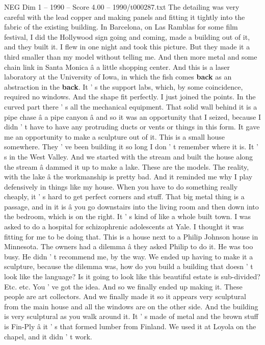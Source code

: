 \begin{textsample}{NEG Dim 1 – 1990 – Score 4.00 – 1990/t000287.txt}
The detailing was very careful with the lead copper and making panels and fitting it tightly into the fabric of the existing building.
In Barcelona, on Las Ramblas for some film festival, I did the Hollywood sign going and coming, made a building out of it, and they built it.
I flew in one night and took this picture.
But they made it a third smaller than my model without telling me.
And then more metal and some chain link in Santa Monica â a little shopping center.
And this is a laser laboratory at the University of Iowa, in which the fish comes \textbf{back} as an abstraction in the \textbf{back}.
It ' s the support labs, which, by some coincidence, required no windows.
And the shape fit perfectly.
I just joined the points.
In the curved part there ' s all the mechanical equipment.
That solid wall behind it is a pipe chase â a pipe canyon â and so it was an opportunity that I seized, because I didn ' t have to have any protruding ducts or vents or things in this form.
It gave me an opportunity to make a sculpture out of it.
This is a small house somewhere.
They ' ve been building it so long I don ' t remember where it is.
It ' s in the West Valley.
And we started with the stream and built the house along the stream â dammed it up to make a lake.
These are the models.
The reality, with the lake â the workmanship is pretty bad.
And it reminded me why I play defensively in things like my house.
When you have to do something really cheaply, it ' s hard to get perfect corners and stuff.
That big metal thing is a passage, and in it is â you go downstairs into the living room and then down into the bedroom, which is on the right.
It ' s kind of like a whole built town.
I was asked to do a hospital for schizophrenic adolescents at Yale.
I thought it was fitting for me to be doing that.
This is a house next to a Philip Johnson house in Minnesota.
The owners had a dilemma â they asked Philip to do it.
He was too busy.
He didn ' t recommend me, by the way.
We ended up having to make it a sculpture, because the dilemma was, how do you build a building that doesn ' t look like the language?
Is it going to look like this beautiful estate is sub-divided?
Etc. etc.
You ' ve got the idea.
And so we finally ended up making it.
These people are art collectors.
And we finally made it so it appears very sculptural from the main house and all the windows are on the other side.
And the building is very sculptural as you walk around it.
It ' s made of metal and the brown stuff is Fin-Ply â it ' s that formed lumber from Finland.
We used it at Loyola on the chapel, and it didn ' t work.

\end{textsample}
